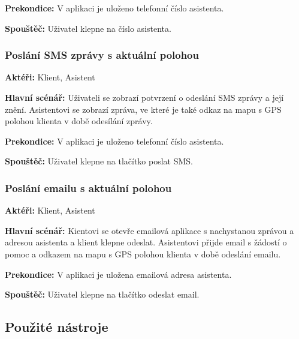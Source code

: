 \documentclass{article}
\newcommand{\usecase}[2]{\subsubsection{#1}\label{#2}}
\begin{document}
\vspace{0.1cm}
\noindent
\textbf{Prekondice:} V aplikaci je uloženo telefonní číslo asistenta.

\vspace{0.1cm}
\noindent
\textbf{Spouštěč:} Uživatel klepne na číslo asistenta.

\usecase{Poslání SMS zprávy s aktuální polohou}{pomocsms}
\textbf{Aktéři:} Klient, Asistent

\vspace{0.1cm}
\noindent
\textbf{Hlavní scénář:} Uživateli se zobrazí potvrzení o odeslání SMS zprávy a její znění.
Asistentovi se zobrazí zpráva, ve které je také odkaz na mapu s GPS polohou klienta v době odesílání zprávy.

\vspace{0.1cm}
\noindent
\textbf{Prekondice:} V aplikaci je uloženo telefonní číslo asistenta.

\vspace{0.1cm}
\noindent
\textbf{Spouštěč:} Uživatel klepne na tlačítko poslat SMS.


\usecase{Poslání emailu s aktuální polohou}{pomocemail}
\textbf{Aktéři:} Klient, Asistent

\vspace{0.1cm}
\noindent
\textbf{Hlavní scénář:} Kientovi se otevře emailová aplikace s nachystanou zprávou a adresou asistenta
a klient klepne odeslat. Asistentovi přijde email s žádostí o pomoc a odkazem na mapu s GPS polohou
klienta v době odeslání emailu.

\vspace{0.1cm}
\noindent
\textbf{Prekondice:} V aplikaci je uložena emailová adresa asistenta.

\vspace{0.1cm}
\noindent
\textbf{Spouštěč:} Uživatel klepne na tlačítko odeslat email.









\subsection{Použité nástroje}
\end{document}
